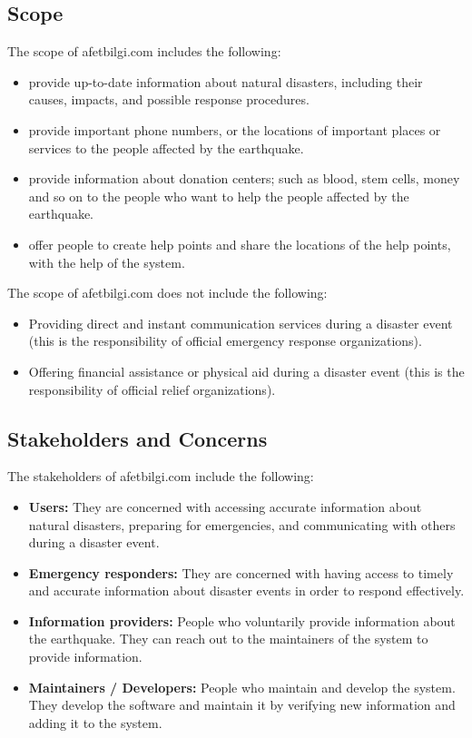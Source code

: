 \documentclass[a4paper]{article}
\begin{document}
    \subsection{Scope}
    The scope of afetbilgi.com includes the following:
    \begin{itemize}
        \item provide up-to-date information about natural disasters, including their causes, impacts, and possible response
        procedures.
        \item provide important phone numbers, or the locations of important places or services to the  people affected by the
        earthquake.
        \item provide information about donation centers; such as blood, stem cells, money and so on to the people who want to
        help the people affected by the earthquake.
        \item offer people to create help points and share the locations of the help points, with the help of the system.
    \end{itemize}

    The scope of afetbilgi.com does not include the following:
    \begin{itemize}
        \item Providing direct and instant communication services during a disaster event (this is the responsibility of
        official emergency response organizations).
        \item Offering financial assistance or physical aid during a disaster event (this is the responsibility of official
        relief organizations).
    \end{itemize}
    \subsection{Stakeholders and Concerns}
    The stakeholders of afetbilgi.com include the following:
    \begin{itemize}
        \item \textbf{Users:} They are concerned with accessing accurate information about natural disasters, preparing for
        emergencies, and communicating with others during a disaster event.
        \item \textbf{Emergency responders:} They are concerned with having access to timely and accurate information about
        disaster events in order to respond effectively.
        \item \textbf{Information providers:} People who voluntarily provide information about the earthquake. They can reach out
        to the maintainers of the system to provide information.
        \item \textbf{Maintainers / Developers:} People who maintain and develop the system. They develop the software and maintain
        it by verifying new information and adding it to the system.
    \end{itemize}
\end{document}
